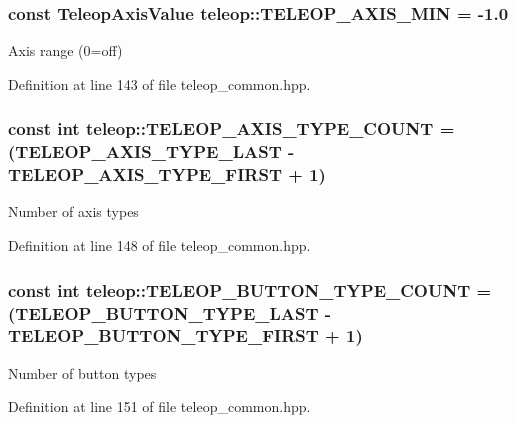 \subsubsection[{TELEOP\_\-AXIS\_\-MIN}]{\setlength{\rightskip}{0pt plus 5cm}const {\bf TeleopAxisValue} {\bf teleop::TELEOP\_\-AXIS\_\-MIN} = -\/1.0\hspace{0.3cm}{\ttfamily  [static]}}\label{namespaceteleop_aa9f9524c2d63470cc26a17fc4b9f7cb3}
Axis range (0=off) 

Definition at line 143 of file teleop\_\-common.hpp.

\subsubsection[{TELEOP\_\-AXIS\_\-TYPE\_\-COUNT}]{\setlength{\rightskip}{0pt plus 5cm}const int {\bf teleop::TELEOP\_\-AXIS\_\-TYPE\_\-COUNT} = (TELEOP\_\-AXIS\_\-TYPE\_\-LAST -\/ TELEOP\_\-AXIS\_\-TYPE\_\-FIRST + 1)\hspace{0.3cm}{\ttfamily  [static]}}\label{namespaceteleop_a92a3d991740f795fc3f328bee57e455a}
Number of axis types 

Definition at line 148 of file teleop\_\-common.hpp.

\subsubsection[{TELEOP\_\-BUTTON\_\-TYPE\_\-COUNT}]{\setlength{\rightskip}{0pt plus 5cm}const int {\bf teleop::TELEOP\_\-BUTTON\_\-TYPE\_\-COUNT} = (TELEOP\_\-BUTTON\_\-TYPE\_\-LAST -\/ TELEOP\_\-BUTTON\_\-TYPE\_\-FIRST + 1)\hspace{0.3cm}{\ttfamily  [static]}}\label{namespaceteleop_a23f29b5821a25e5ab3d40d549f7ca9d6}
Number of button types 

Definition at line 151 of file teleop\_\-common.hpp.

